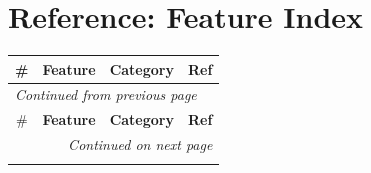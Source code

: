\documentclass[11pt,a4paper]{article}
\begin{document}
\section{Reference: Feature Index}

\begin{longtable}{@{}cllc@{}}
  \toprule
  \# & \textbf{Feature} & \textbf{Category} & \textbf{Ref} \\
  \midrule
  \endfirsthead

  \multicolumn{4}{l}{\textit{Continued from previous page}} \\
  \toprule
  \# & \textbf{Feature} & \textbf{Category} & \textbf{Ref} \\
  \midrule
  \endhead

  \bottomrule
  \multicolumn{4}{r}{\textit{Continued on next page}} \\
  \endfoot

  \bottomrule
  \endlastfoot


\end{longtable}
\end{document}
